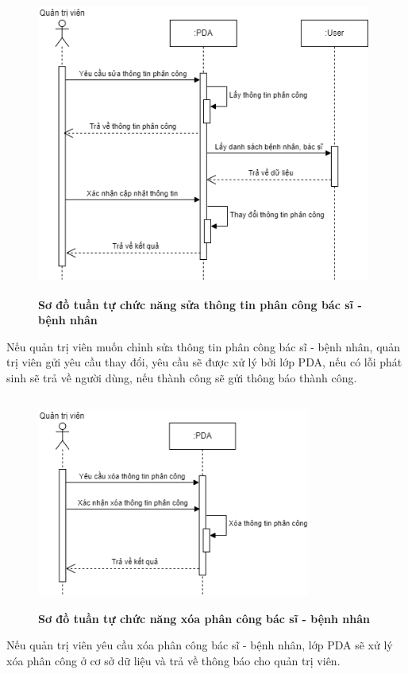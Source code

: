 \begin{figure}[H]
  \centering
  \includegraphics[width=11cm,height=10cm]{Images/sequence/sequence_manage_edit_pda.png}
  \caption[Sơ đồ tuần tự chức năng sửa thông tin phân công bác sĩ - bệnh nhân]{\bfseries \fontsize{12pt}{0pt}
  \selectfont Sơ đồ tuần tự chức năng sửa thông tin phân công bác sĩ - bệnh nhân}
  \label{sequence_manage_edit_pda} %
\end{figure}
Nếu quản trị viên muốn chỉnh sửa thông tin phân công bác sĩ - bệnh nhân, quản trị viên gửi yêu cầu thay đổi, 
yêu cầu sẽ được xử lý bởi lớp PDA, nếu có lỗi phát sinh sẽ trả về người dùng, nếu thành công sẽ gửi thông báo thành công. 
\begin{figure}[H]
  \centering
  \includegraphics[width=9cm,height=7cm]{Images/sequence/sequence_manage_delete_pda.png}
  \caption[Sơ đồ tuần tự chức năng xóa phân công bác sĩ - bệnh nhân]{\bfseries \fontsize{12pt}{0pt}
  \selectfont Sơ đồ tuần tự chức năng xóa phân công bác sĩ - bệnh nhân}
  \label{sequence_manage_delete_pda} %
\end{figure}
Nếu quản trị viên yêu cầu xóa phân công bác sĩ - bệnh nhân, lớp PDA sẽ xử lý xóa phân công ở cơ sở dữ liệu và trả về thông báo cho quản trị viên.

